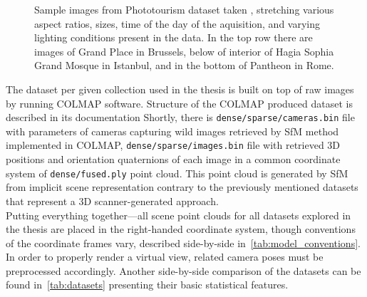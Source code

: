 \begin{figure}
\begin{subfigure}{.5\textwidth}
	\end{subfigure}
	\caption[Sample images from Phototourism dataset]{Sample images from
        Phototourism dataset taken , stretching various aspect ratios, sizes, time of the day of the
        aquisition, and varying lighting conditions present in the data. In the top
        row there are images of Grand Place in Brussels, below of interior of Hagia
        Sophia Grand Mosque in Istanbul, and in the bottom of Pantheon in
        Rome.}\label{fig:imc_dataset}
\end{figure}

The dataset per given collection used in the thesis is built on top of raw images by
running COLMAP software. Structure of the COLMAP produced dataset is described in its
documentation Shortly, there is
\verb|dense/sparse/cameras.bin| file with parameters of cameras capturing wild images
retrieved by SfM method implemented in COLMAP, \verb|dense/sparse/images.bin| file with
retrieved 3D positions and orientation quaternions of each image in a common coordinate
system of \verb|dense/fused.ply| point cloud. This point cloud is generated by SfM from
implicit scene representation contrary to the previously mentioned datasets that represent
a 3D scanner-generated approach.\\

Putting everything together---all scene point clouds for all datasets explored in the
thesis are placed in the right-handed coordinate system, though conventions of the
coordinate frames vary, described  side-by-side in~\cref{tab:model_conventions}. In order
to properly render a virtual view, related camera poses must be preprocessed accordingly.
Another side-by-side comparison of the datasets can be found in~\cref{tab:datasets}
presenting their basic statistical features.

